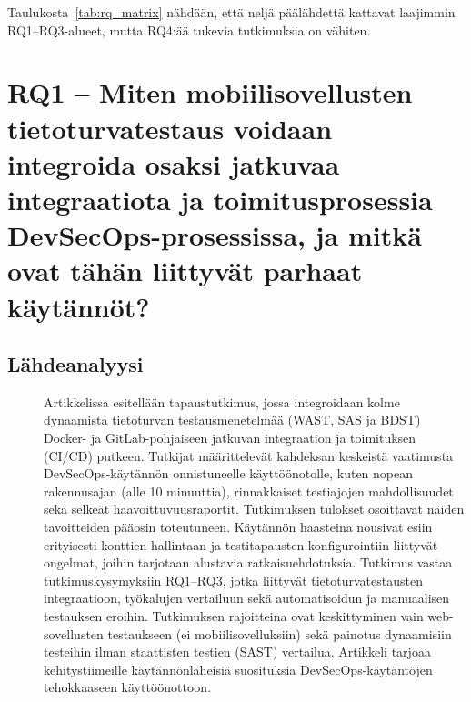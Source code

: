 \documentclass[bscthesis,finnish,oneside,biblatex]{uefcsthesis}
\begin{document}
Taulukosta~\ref{tab:rq_matrix} nähdään, että neljä päälähdettä
kattavat laajimmin RQ1–RQ3-alueet, mutta RQ4:ää tukevia tutkimuksia on
vähiten.

\section{RQ1 – Miten mobiilisovellusten tietoturvatestaus voidaan integroida osaksi jatkuvaa integraatiota ja toimitusprosessia DevSecOps-prosessissa, ja mitkä ovat tähän liittyvät parhaat käytännöt?}
\label{sec:rq1}


\subsection{Lähdeanalyysi}
\begin{description}
    \item[\cite{rangnau2020_cst}] Artikkelissa esitellään tapaustutkimus, jossa integroidaan kolme dynaamista tietoturvan testausmenetelmää
    (WAST, SAS ja BDST) Docker- ja GitLab-pohjaiseen jatkuvan integraation ja toimituksen (CI/CD) putkeen. Tutkijat määrittelevät kahdeksan
    keskeistä vaatimusta DevSecOps-käytännön onnistuneelle käyttöönotolle, kuten nopean rakennusajan (alle 10 minuuttia), rinnakkaiset
    testiajojen mahdollisuudet sekä selkeät haavoittuvuusraportit. Tutkimuksen tulokset osoittavat näiden tavoitteiden pääosin toteutuneen.
    Käytännön haasteina nousivat esiin erityisesti konttien hallintaan ja testitapausten konfigurointiin liittyvät ongelmat,
    joihin tarjotaan alustavia ratkaisuehdotuksia. Tutkimus vastaa tutkimuskysymyksiin RQ1–RQ3, jotka liittyvät tietoturvatestausten integraatioon,
    työkalujen vertailuun sekä automatisoidun ja manuaalisen testauksen eroihin. Tutkimuksen rajoitteina ovat keskittyminen vain web-sovellusten
    testaukseen (ei mobiilisovelluksiin) sekä painotus dynaamisiin testeihin ilman staattisten testien (SAST) vertailua.
    Artikkeli tarjoaa kehitystiimeille käytännönläheisiä suosituksia DevSecOps-käytäntöjen tehokkaaseen käyttöönottoon.
\end{description}
\end{document}
